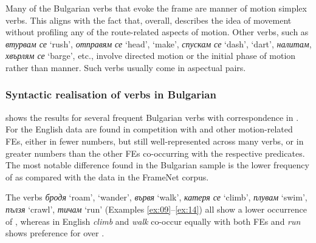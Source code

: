 \documentclass[output=paper,colorlinks,citecolor=brown]{langscibook}
\begin{document}
Many of the Bulgarian verbs that evoke the  frame are manner of motion simplex verbs. This aligns with the fact that, overall,  describes the idea of movement without profiling any of the route-related aspects of motion. Other verbs, such as \textit{втурвам се} `rush’, \textit{отправям се} `head’, `make’, \textit{спускам се} `dash’, `dart’, \textit{налитам}, \textit{хвърлям се} `barge’, etc., involve directed motion or the initial phase of motion rather than manner. Such verbs usually come in aspectual pairs. 

\subsubsection{Syntactic realisation of  verbs in Bulgarian}

 shows the results for several frequent Bulgarian verbs with correspondence in . For the English data   are found in competition with  and other motion-related FEs, either in fewer numbers, but still well-represented across many verbs, or in greater numbers than the other FEs co-occurring with the respective predicates. The most notable difference found in the Bulgarian sample is the lower frequency of  as compared with the data in the FrameNet corpus.

The verbs \textit{бродя} `roam’, `wander’, \textit{вървя} `walk’, \textit{катеря се} `climb’, \textit{плувам} `swim’, \textit{пълзя} `crawl’, \textit{тичам} `run’ (Examples \ref{ex:09}--\ref{ex:14}) all show a lower occurrence of , whereas in English \textit{climb} and \textit{walk} co-occur equally with both FEs and \textit{run} shows preference for  over .  
\end{document}
